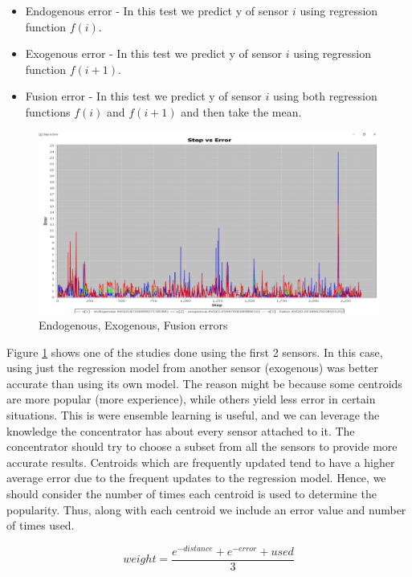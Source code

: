 \documentclass{mproj}
\begin{document}
\begin{itemize}  
\item Endogenous error - In this test we predict y of sensor $i$ using regression function $f(i)$.
\item Exogenous error - In this test we predict y of sensor $i$ using regression function $f(i+1)$.
\item Fusion error - In this test we predict y of sensor $i$ using both regression functions $f(i)$ and $f(i+1)$ and then take the mean.
\end{itemize}

\begin{figure}[H]
\caption{Endogenous, Exogenous, Fusion errors}
\label{fig:functionsErrors}
\centerline{\includegraphics[scale=0.4]{e1e2e3}}
\end{figure}

Figure \ref{fig:functionsErrors} shows one of the studies done using the first 2 sensors. In this case, using just the regression model from another sensor (exogenous) was better accurate than using its own model. The reason might be because some centroids are more popular (more experience), while others yield less error in certain situations. This is were ensemble learning is useful, and we can leverage the knowledge the concentrator has about every sensor attached to it. The concentrator should try to choose a subset from all the sensors to provide more accurate results. Centroids which are frequently updated tend to have a higher average error due to the frequent updates to the regression model. Hence, we should consider the number of times each centroid is used to determine the popularity. Thus, along with each centroid we include an error value and number of times used.

\begin{equation}
\label{eq:ourEquation}
weight=\frac{e^{-distance} + e^{-error} + used}{3}
\end{equation}
\end{document}
